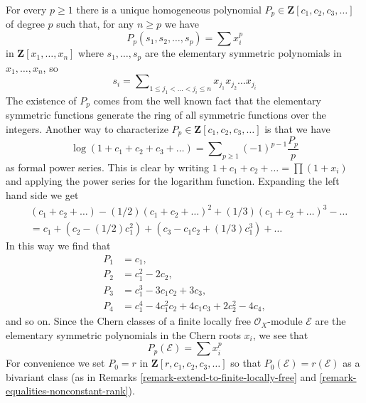 \begin{example}
\label{example-power-sum}
For every $p \geq 1$ there is a unique homogeneous polynomial
$P_p \in \mathbf{Z}[c_1, c_2, c_3, \ldots]$ of degree $p$
such that, for any $n \geq p$ we have
$$
P_p(s_1, s_2, \ldots, s_p) = \sum x_i^p
$$
in $\mathbf{Z}[x_1, \ldots, x_n]$ where $s_1, \ldots, s_p$ are the
elementary symmetric polynomials in $x_1, \ldots, x_n$, so
$$
s_i = \sum\nolimits_{1 \leq j_1 < \ldots < j_i \leq n}
x_{j_1}x_{j_2} \ldots x_{j_i}
$$
The existence of $P_p$ comes from the well known fact that
the elementary symmetric functions generate the ring of
all symmetric functions over the integers. Another way to
characterize $P_p \in \mathbf{Z}[c_1, c_2, c_3, \ldots]$ is that we have
$$
\log(1 + c_1 + c_2 + c_3 + \ldots) =
\sum\nolimits_{p \geq 1} (-1)^{p - 1}\frac{P_p}{p}
$$
as formal power series. This is clear by writing
$1 + c_1 + c_2 + \ldots = \prod (1 + x_i)$ and applying
the power series for the logarithm function. Expanding the left
hand side we get
\begin{align*}
& (c_1 + c_2 + \ldots) - (1/2)(c_1 + c_2 + \ldots)^2 +
(1/3)(c_1 + c_2 + \ldots)^3 - \ldots \\
& =
c_1 + (c_2 - (1/2)c_1^2) + (c_3 - c_1c_2 + (1/3)c_1^3) + \ldots
\end{align*}
In this way we find that
\begin{align*}
P_1 & = c_1, \\
P_2 & = c_1^2 - 2c_2, \\
P_3 & = c_1^3 - 3c_1c_2 + 3c_3, \\
P_4 & = c_1^4 - 4c_1^2c_2 + 4c_1c_3 + 2c_2^2 - 4c_4,
\end{align*}
and so on. Since the Chern classes of a finite locally free
$\mathcal{O}_X$-module $\mathcal{E}$ are the elementary symmetric
polynomials in the Chern roots $x_i$, we see that
$$
P_p(\mathcal{E}) = \sum x_i^p
$$
For convenience we set $P_0 = r$ in $\mathbf{Z}[r, c_1, c_2, c_3, \ldots]$
so that $P_0(\mathcal{E}) = r(\mathcal{E})$ as a bivariant class
(as in Remarks \ref{remark-extend-to-finite-locally-free} and
\ref{remark-equalities-nonconstant-rank}).
\end{example}






